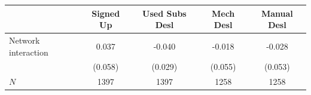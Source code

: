 \begin{tabular}{lcccc}
\hline\hline
 & Signed Up & Used Subs Desl & Mech Desl & Manual Desl \\
\hline
Network interaction & 0.037 & -0.040 & -0.018 & -0.028 \\
 & (0.058) & (0.029) & (0.055) & (0.053) \\
\hline
$N$ & 1397 & 1397 & 1258 & 1258 \\
\hline\hline
\end{tabular}
